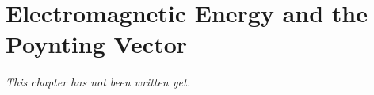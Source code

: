 \chapter{Electromagnetic Energy and the Poynting Vector}\label{ch:b2:poynting-vector}


\emph{This chapter has not been written yet.}
